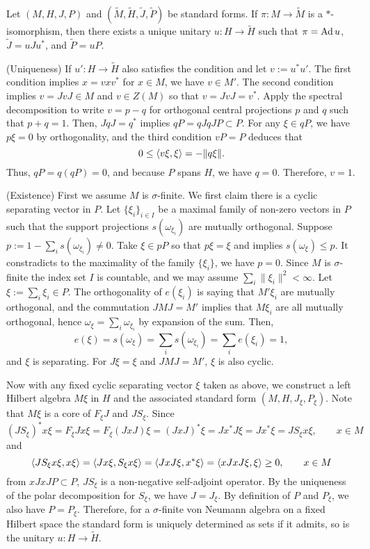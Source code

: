 \documentclass{../../large}
\begin{document}
\begin{prb}
Let $(M,H,J,P)$ and $(\tilde M,\tilde H,\tilde J,\tilde P)$ be standard forms.
If $\pi:M\to\tilde M$ is a $*$-isomorphism, then there exists a unique unitary $u:H\to\tilde H$ such that $\pi=\operatorname{Ad} u$, $\tilde J=uJu^*$, and $\tilde P=uP$.
\end{prb}
\begin{pf}
(Uniqueness)
If $u':H\to \tilde H$ also satisfies the condition and let $v:=u^*u'$.
The first condition implies $x=vxv^*$ for $x\in M$, we have $v\in M'$.
The second condition implies $v=JvJ\in M$ and $v\in Z(M)$ so that $v=JvJ=v^*$.
Apply the spectral decomposition to write $v=p-q$ for orthogonal central projections $p$ and $q$ such that $p+q=1$.
Then, $JqJ=q^*$ implies $qP=qJqJP\subset P$.
For any $\xi\in qP$, we have $p\xi=0$ by orthogonality, and the third condition $vP=P$ deduces that
\[0\le\langle v\xi,\xi\rangle=-\|q\xi\|.\]
Thus, $qP=q(qP)=0$, and because $P$ spans $H$, we have $q=0$.
Therefore, $v=1$.

(Existence)
First we assume $M$ is $\sigma$-finite.
We first claim there is a cyclic separating vector in $P$.
Let $\{\xi_i\}_{i\in I}$ be a maximal family of non-zero vectors in $P$ such that the support projections $s(\omega_{\xi_i})$ are mutually orthogonal.
Suppose $p:=1-\sum_is(\omega_{\xi_i})\ne0$.
Take $\xi\in pP$ so that $p\xi=\xi$ and implies $s(\omega_\xi)\le p$.
It constradicts to the maximality of the family $\{\xi_i\}$, we have $p=0$.
Since $M$ is $\sigma$-finite the index set $I$ is countable, and we may assume $\sum_i\|\xi_i\|^2<\infty$.
Let $\xi:=\sum_i\xi_i\in P$.
The orthogonality of $e(\xi_i)$ is saying that $M'\xi_i$ are mutually orthogonal, and the commutation $JMJ=M'$ implies that $M\xi_i$ are all mutually orthogonal, hence $\omega_\xi=\sum_i\omega_{\xi_i}$ by expansion of the sum.
Then,
\[e(\xi)=s(\omega_\xi)=\sum_is(\omega_{\xi_i})=\sum_ie(\xi_i)=1,\]
and $\xi$ is separating.
For $J\xi=\xi$ and $JMJ=M'$, $\xi$ is also cyclic.

Now with any fixed cyclic separating vector $\xi$ taken as above, we construct a left Hilbert algebra $M\xi$ in $H$ and the associated standard form $(M,H,J_\xi,P_\xi)$.
Note that $M\xi$ is a core of $F_\xi J$ and $JS_\xi$.
Since
\[(JS_\xi)^*x\xi=F_\xi Jx\xi=F_\xi(JxJ)\xi=(JxJ)^*\xi=Jx^*J\xi=Jx^*\xi=JS_\xi x\xi,\qquad x\in M\]
and
\[\langle JS_\xi x\xi,x\xi\rangle=\langle Jx\xi,S_\xi x\xi\rangle=\langle JxJ\xi,x^*\xi\rangle=\langle xJxJ\xi,\xi\rangle\ge0,\qquad x\in M\]
from $xJxJP\subset P$, $JS_\xi$ is a non-negative self-adjoint operator.
By the uniqueness of the polar decomposition for $S_\xi$, we have $J=J_\xi$.
By definition of $P$ and $P_\xi$, we also have $P=P_\xi$.
Therefore, for a $\sigma$-finite von Neumann algebra on a fixed Hilbert space the standard form is uniquely determined as sets if it admits, so is the unitary $u:H\to\tilde H$.


\end{pf}
\end{document}
